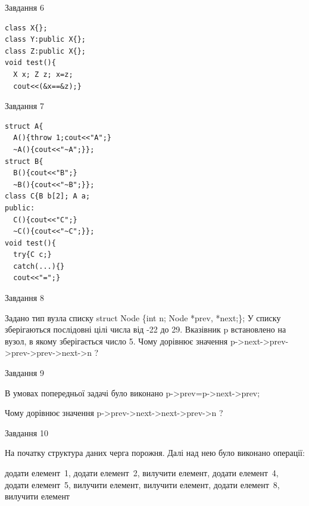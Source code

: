 \documentclass[12pt, ukrainian]{article}
\begin{document}
{{{\begin{minipage}[t]{7cm}
               
{\begin{center}Завдання {6}\end{center}}
\vspace{-6mm}

\begin{verbatim}
class X{};
class Y:public X{};
class Z:public X{};
void test(){
  X x; Z z; x=z;
  cout<<(&x==&z);}
\end{verbatim}            


               
{\begin{center}Завдання {7}\end{center}}
\vspace{-6mm}

\begin{verbatim}
struct A{
  A(){throw 1;cout<<"A";}
  ~A(){cout<<"~A";}};
struct B{
  B(){cout<<"B";}
  ~B(){cout<<"~B";}};
class C{B b[2]; A a;
public:
  C(){cout<<"C";}
  ~C(){cout<<"~C";}};
void test(){
  try{C c;} 
  catch(...){} 
  cout<<"=";}
\end{verbatim}            


\end{minipage}
               
{\begin{center}Завдання {8}\end{center}}
\vspace{-6mm}
Задано тип вузла списку
struct Node \{int n; Node *prev, *next;\};
У списку зберігаються послідовні цілі числа від -22 до 29. Вказівник p встановлено на вузол, в якому зберігається число 5.
Чому дорівнює значення p->next->prev->prev->prev->next->n ?\par

               
{\begin{center}Завдання {9}\end{center}}
\vspace{-6mm}
В умовах попередньої задачі було виконано p->prev=p->next->prev;

Чому дорівнює значення p->prev->next->next->prev->n ?\par

\newpage
               
{\begin{center}Завдання {10}\end{center}}
\vspace{-6mm}
На початку структура даних черга порожня. Далі над нею було виконано операції:

додати елемент~1, додати елемент~2, вилучити елемент, додати елемент~4, додати елемент~5, вилучити елемент, вилучити елемент, додати елемент~8, вилучити елемент

}}}
\end{document}
